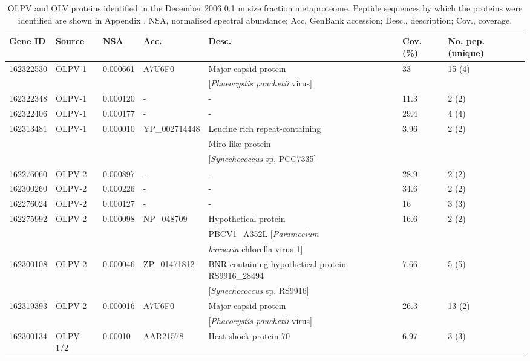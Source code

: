 \begingroup
\begin{table}
\footnotesize
\caption[OLPV and OLV proteins identified in the metaproteome]{OLPV and OLV proteins identified in the December 2006 0.1 \textmu{}m size fraction metaproteome. Peptide sequences by which the proteins were identified are shown in Appendix . NSA, normalised spectral abundance; Acc, GenBank accession; Desc., description; Cov., coverage.}
\label{tab:pmics}
\smallskip
\begin{tabularx}{\textwidth}{p{1.3cm}p{1.2cm}p{1cm}p{2cm}p{4.7cm}p{0.6cm}p{1cm}}
\toprule
\textbf{Gene ID} & \textbf{Source} & \textbf{NSA} & \textbf{Acc.} & \textbf{Desc.} & \textbf{Cov. (\%)} & \textbf{No. pep. (unique)} \\
\midrule
162322530 & OLPV-1 & 0.000661 & A7U6F0 & Major capsid protein & 33 & 15 (4) \\
 &  &  &  & [\emph{Phaeocystis pouchetii} virus] &  & \\
162322348 & OLPV-1 & 0.000120 & - & - & 11.3 & 2 (2) \\
162322406 & OLPV-1 & 0.000177 & - & - & 29.4 & 4 (4) \\
162313481 & OLPV-1 & 0.000010 & YP\_002714448 & Leucine rich repeat-containing & 3.96 & 2 (2) \\
 &  &  &  & Miro-like protein & & \\
 &  &  &  & [\emph{Synechococcus} sp. PCC7335] &  & \\
162276060 & OLPV-2 & 0.000897 & - & - & 28.9 & 2 (2) \\
162300260 & OLPV-2 & 0.000226 & - & - & 34.6 & 2 (2) \\
162276024 & OLPV-2 & 0.000127 & - & - & 16 & 3 (3) \\
162275992 & OLPV-2 & 0.000098 & NP\_048709 & Hypothetical protein & 16.6 & 2 (2) \\
 &  &  &  & PBCV1\_A352L [\emph{Paramecium} & &  \\
 &  &  &  & \emph{bursaria} chlorella virus 1] & &  \\
162300108 & OLPV-2 & 0.000046 & ZP\_01471812 & BNR containing hypothetical protein RS9916\_28494 & 7.66 & 5 (5) \\
 &  &  &  & [\emph{Synechococcus} sp. RS9916] &  &  \\
162319393 & OLPV-2 & 0.000016 & A7U6F0 & Major capsid protein & 26.3 & 13 (2) \\
 &  &  &  & [\emph{Phaeocystis pouchetii} virus] &  &  \\
162300134 & OLPV-1/2 & 0.00010 & AAR21578 & Heat shock protein 70 & 6.97 & 3 (3) \\

\end{tabularx}
\end{table}
